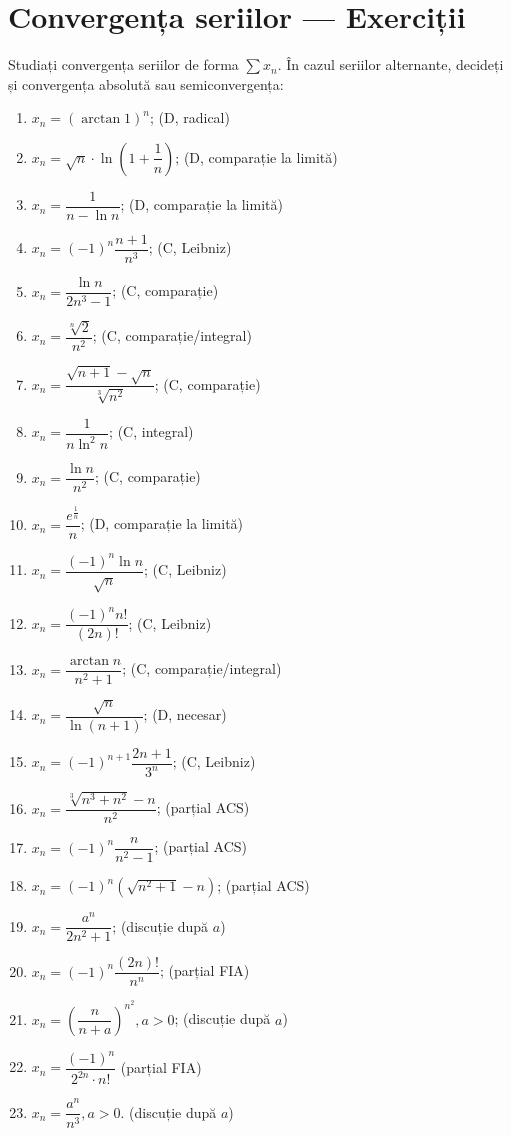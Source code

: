 \chapter{Convergența seriilor --- Exerciții}

Studiați convergența seriilor de forma $ \sum x_n $. În cazul
seriilor alternante, decideți și convergența absolută sau semiconvergența:
\begin{enumerate}[(1)]
    \item $ x_n = (\arctan 1)^n $; \hfill(D, radical)
    \item $ x_n = \sqrt{n} \cdot \ln \left( 1 + \dfrac{1}{n} \right) $; \hfill(D, comparație la limită)
    \item $ x_n = \dfrac{1}{n - \ln n} $; \hfill(D, comparație la limită)
    \item $ x_n = (-1)^n \dfrac{n + 1}{n^3} $; \hfill(C, Leibniz)
    \item $ x_n = \dfrac{\ln n}{2n^3 - 1} $; \hfill(C, comparație)
    \item $ x_n = \dfrac{\sqrt[n]{2}}{n^2} $; \hfill(C, comparație/integral)
    \item $ x_n = \dfrac{\sqrt{n + 1} - \sqrt{n}}{\sqrt[3]{n^2}} $; \hfill(C, comparație)
    \item $ x_n = \dfrac{1}{n \ln^2 n} $; \hfill(C, integral)
    \item $ x_n = \dfrac{\ln n}{n^2} $; \hfill(C, comparație)
    \item $ x_n = \dfrac{e^\frac{1}{n}}{n} $; \hfill(D, comparație la limită)
    \item $ x_n = \dfrac{(-1)^n \ln n}{\sqrt{n}} $; \hfill(C, Leibniz)
    \item $ x_n = \dfrac{(-1)^n n!}{(2n)!} $; \hfill(C, Leibniz)
    \item $ x_n = \dfrac{\arctan n}{n^2 + 1} $; \hfill(C, comparație/integral)
    \item $ x_n = \dfrac{\sqrt{n}}{\ln(n + 1)} $; \hfill(D, necesar)
    \item $ x_n = (-1)^{n+1} \dfrac{2n + 1}{3^n} $; \hfill(C, Leibniz)
    \item $ x_n = \dfrac{\sqrt[3]{n^3 + n^2} - n}{n^2} $; \hfill(parțial ACS)
    \item $ x_n = (-1)^n \dfrac{n}{n^2 - 1} $; \hfill(parțial ACS)
    \item $ x_n = (-1)^n (\sqrt{n^2 + 1} - n) $; \hfill(parțial ACS)
    \item $ x_n = \dfrac{a^n}{2n^2 + 1} $; \hfill(discuție după $ a $)
    \item $ x_n = (-1)^n \dfrac{(2n)!}{n^n} $; \hfill(parțial FIA)
    \item $ x_n = \left( \dfrac{n}{n + a} \right)^{n^2}, a > 0 $; \hfill(discuție după $ a $)
    \item $ x_n = \dfrac{(-1)^n}{2^{2n} \cdot n!} $ \hfill(parțial FIA)
    \item $ x_n = \dfrac{a^n}{n^3}, a > 0 $. \hfill(discuție după $ a $)
\end{enumerate}
